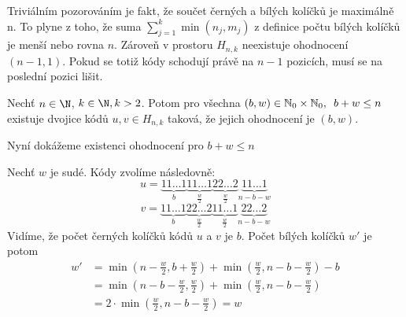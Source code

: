 Triviálním pozorováním je fakt, že součet černých a bílých kolíčků je maximálně n. To plyne z toho, že suma $\sum_{j = 1}^k  \min(n_j, m_j)$ z definice počtu bílých kolíčků je menší nebo rovna $n$. Zároveň v prostoru $H_{n,k}$ neexistuje ohodnocení $(n-1,1)$. Pokud se totiž kódy schodují právě na $n-1$ pozicích, musí se na poslední pozici lišit. 
\begin{tvrz}\label{pozmozneohodnoceni}
    Nechť $n \in \N$, $k \in \N, k>2$. Potom pro všechna $(b,w)\in \mathbb{N}_0 \times \mathbb{N}_0,\hspace{5px} b + w \leq n$ existuje dvojice kódů $u,v \in H_{n,k}$ taková, že jejich ohodnocení je $(b,w)$.
\end{tvrz}
\begin{dukaz}

    Nyní dokážeme existenci ohodnocení pro $b+w \leq n$
    
    Nechť $w$ je sudé. Kódy zvolíme následovně:
\[
  u = 
    \underbrace{11\dots1}_{b}
    \underbrace{11\dots1}_{\frac{w}{2}}
    \underbrace{22\dots2}_{\frac{w}{2}}
    \underbrace{11\dots1}_{n-b-w}
 \]
 \[
  v = 
    \underbrace{11\dots1}_{b}
    \underbrace{22\dots2}_{\frac{w}{2}}
    \underbrace{11\dots1}_{\frac{w}{2}}
    \underbrace{22\dots2}_{n-b-w}
 \]
Vidíme, že počet černých kolíčků kódů $u$ a $v$ je $b$. Počet bílých kolíčků $w'$ je potom
\begin{align*} 
w' &= \min\left(n - \frac{w}{2}, b + \frac{w}{2}\right) + \min\left(\frac{w}{2}, n - b - \frac{w}{2}\right) - b \\ 
&= \min\left(n - b - \frac{w}{2}, \frac{w}{2}\right) + \min\left(\frac{w}{2}, n - b - \frac{w}{2}\right) \\
&= 2\cdot\min\left(\frac{w}{2}, n - b - \frac{w}{2}\right) = w
\end{align*}


\end{dukaz}
